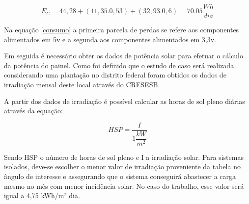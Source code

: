 \begin{equation}
E_C = 44,28 + (11,35 . 0,53) + (32,93 . 0,6) = 70.05 \dfrac{Wh}{dia}
\label{consumo}
\end{equation}

	Na equação \ref{consumo} a primeira parcela de perdas se refere aos componentes alimentados em 5v e a segunda aos componentes alimentados em 3,3v.

	Em seguida é necessário obter os dados de potência solar para efetuar o cálculo da potência do painel. Como foi definido que o estudo de caso será realizada considerando uma plantação no distrito federal foram obtidos os dados de irradiação mensal deste local através do CRESESB. 
	
\begin{table}[H]
\centering
\caption{Irradiação solar média em Brasília. \cite{crecesb}}
\label{ene_pc2_03_tab}
\end{table}

A partir dos dados de irradiação é possível calcular as horas de sol pleno diárias através da equação:

\begin{equation}
HSP = \dfrac{I}{1 \dfrac{kW}{m^2}}
\end{equation}

Sendo HSP o número de horas de sol pleno e I a irradiação solar. Para sistemas isolados, deve-se escolher o menor valor de irradiação proveniente da tabela no ângulo de interesse e assegurando que o sistema conseguirá abastecer a carga mesmo no mês com menor incidência solar. No caso do trabalho, esse valor será igual a 4,75 kWh/m² dia.

